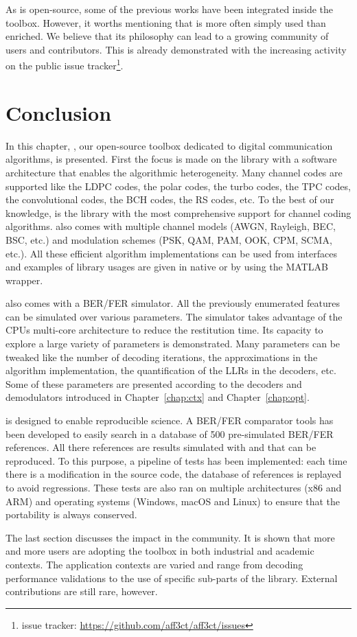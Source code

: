 As \AFFECT is open-source, some of the previous works have been integrated
inside the toolbox. However, it worths mentioning that \AFFECT is more often
simply used than enriched. We believe that its philosophy can lead to a growing
community of users and contributors. This is already demonstrated with the
increasing activity on the public issue tracker\footnote{\AFFECT issue tracker:
\url{https://github.com/aff3ct/aff3ct/issues}}.

\section{Conclusion}

In this chapter, \AFFECT, our open-source toolbox dedicated to digital
communication algorithms, is presented. First the focus is made on the library
with a software architecture that enables the algorithmic heterogeneity. Many
channel codes are supported like the LDPC codes, the polar codes, the turbo
codes, the TPC codes, the convolutional codes, the BCH codes, the RS codes, etc.
To the best of our knowledge, \AFFECT is the library with the most comprehensive
support for channel coding algorithms. \AFFECT also comes with multiple channel
models (AWGN, Rayleigh, BEC, BSC, etc.) and modulation schemes (PSK, QAM, PAM,
OOK, CPM, SCMA, etc.). All these efficient algorithm implementations can be
used from interfaces and examples of library usages are given in native \Cxx or
by using the MATLAB wrapper.

\AFFECT also comes with a BER/FER simulator. All the previously enumerated
features can be simulated over various parameters. The simulator takes advantage
of the CPUs multi-core architecture to reduce the restitution time. Its capacity
to explore a large variety of parameters is demonstrated. Many parameters can be
tweaked like the number of decoding iterations, the approximations in the
algorithm implementation, the quantification of the LLRs in the decoders, etc.
Some of these parameters are presented according to the decoders and
demodulators introduced in Chapter~\ref{chap:ctx} and Chapter~\ref{chap:opt}.

\AFFECT is designed to enable reproducible science. A BER/FER comparator tools
has been developed to easily search in a database of 500 pre-simulated BER/FER
references. All there references are results simulated with \AFFECT and that can
be reproduced. To this purpose, a pipeline of tests has been implemented: each
time there is a modification in the source code, the database of references is
replayed to avoid regressions. These tests are also ran on multiple
architectures (x86 and ARM\R) and operating systems (Windows, macOS and Linux)
to ensure that the portability is always conserved.

The last section discusses the \AFFECT impact in the community. It is shown that
more and more users are adopting the toolbox in both industrial and academic
contexts. The application contexts are varied and range from decoding
performance validations to the use of specific sub-parts of the library.
External contributions are still rare, however.
